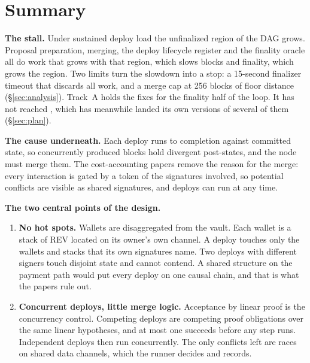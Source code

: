 \documentclass[11pt]{article}
\newcommand{\code}{\path}
\begin{document}
\begin{abstract}
\end{abstract}

\tableofcontents
\newpage

\section{Summary}

\textbf{The stall.} Under sustained deploy load the unfinalized region of the DAG grows. Proposal preparation, merging, the deploy lifecycle register and the finality oracle all do work that grows with that region, which slows blocks and finality, which grows the region. Two limits turn the slowdown into a stop: a 15-second finalizer timeout that discards all work, and a merge cap at 256 blocks of floor distance (\S\ref{sec:analysis}). Track~A holds the fixes for the finality half of the loop. It has not reached \code{dev}, which has meanwhile landed its own versions of several of them (\S\ref{sec:plan}).

\textbf{The cause underneath.} Each deploy runs to completion against committed state, so concurrently produced blocks hold divergent post-states, and the node must merge them. The cost-accounting papers remove the reason for the merge: every interaction is gated by a token of the signatures involved, so potential conflicts are visible as shared signatures, and deploys can run at any time.

\textbf{The two central points of the design.}
\begin{enumerate}
\item \textbf{No hot spots.} Wallets are disaggregated from the vault. Each wallet is a stack of REV located on its owner's own channel. A deploy touches only the wallets and stacks that its own signatures name. Two deploys with different signers touch disjoint state and cannot contend. A shared structure on the payment path would put every deploy on one causal chain, and that is what the papers rule out.
\item \textbf{Concurrent deploys, little merge logic.} Acceptance by linear proof is the concurrency control. Competing deploys are competing proof obligations over the same linear hypotheses, and at most one succeeds before any step runs. Independent deploys then run concurrently. The only conflicts left are races on shared data channels, which the runner decides and records.
\end{enumerate}
\end{document}
